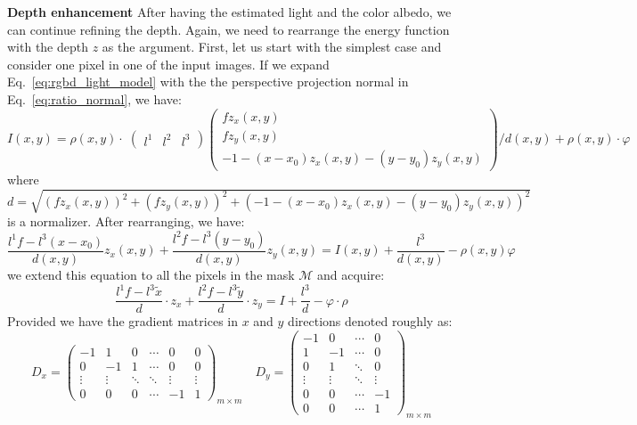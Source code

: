 \textbf{Depth enhancement}
After having the estimated light and the color albedo, we can continue refining the depth.
Again, we need to rearrange the energy function with the depth $z$ as the argument.
First, let us start with the simplest case and consider one pixel in one of the input images.
If we expand Eq.~\ref{eq:rgbd_light_model} with the the perspective projection normal in Eq.~\ref{eq:ratio_normal}, we have:
\begin{equation}
    I(x,y) = \rho(x,y) \cdot \; 
    \begin{pmatrix}
        l^1 & l^2 & l^3 
    \end{pmatrix}
     \begin{pmatrix}
         fz_x(x,y)\\
         fz_y(x,y)\\
         -1 - (x - x_0)z_x(x,y) - (y - y_0)z_y(x,y)
     \end{pmatrix}/ d(x,y)
     + \rho(x,y) \cdot \varphi   
\end{equation}
where $d = \sqrt{(fz_x(x,y))^2 + (fz_y(x,y))^2 + (-1 - (x - x_0)z_x(x,y) - (y - y_0)z_y(x,y))^2}$ is a normalizer.
After rearranging, we have:
\begin{equation}
    \frac{l^1f - l^3(x-x_0)}{d(x,y)}z_x(x,y) + \frac{l^2f - l^3(y-y_0)}{d(x,y)}z_y(x,y) = I(x,y) + \frac{l^3}{d(x,y)} - \rho(x,y)\varphi
\end{equation}
we extend this equation to all the pixels in the mask $\mathcal{M}$ and acquire:
\begin{equation}\label{eq:robust_depth1}
    \frac{l^1f - l^3\tilde{x}}{d} \cdot z_x + \frac{l^2f - l^3\tilde{y}}{d} \cdot z_y = I + \frac{l^3}{d} - \varphi \cdot \rho
\end{equation}
Provided we have the gradient matrices in $x$ and $y$ directions denoted roughly as:
\begin{equation}
D_x = \begin{pmatrix}
-1 & 1 & 0 &\cdots & 0 & 0 \\
0 & -1 & 1 &\cdots &  0 & 0 \\
\vdots & \vdots & \ddots & \ddots & \vdots & \vdots \\
0 & 0 & 0 & \cdots & -1 & 1
\end{pmatrix}_{m\times m}
\quad
D_y = \begin{pmatrix}
-1 & 0 & \cdots & 0 \\
1 & -1 & \cdots & 0 \\
0 & 1 & \ddots & 0 \\
\vdots & \vdots & \ddots & \vdots\\
0 & 0 & \cdots & -1\\
0 & 0 & \cdots & 1
\end{pmatrix}_{m\times m}
\end{equation}
